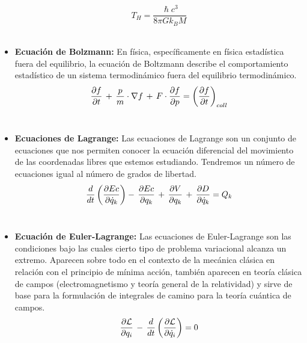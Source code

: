\documentclass[letterpaper, 12pt]{article}
\begin{document}
\begin{itemize}
            \begin{equation*}
                T_{H} = \frac{\hslash c^{3}}{8 \pi Gk_{B}M}
            \end{equation*}\\
            
        \item \textbf{Ecuación de Bolzmann:} En física, específicamente en física estadística fuera del equilibrio, la ecuación de Boltzmann describe el comportamiento estadístico de un sistema termodinámico fuera del equilibrio termodinámico. \\
        
            \begin{equation*}
                \frac{\partial f}{\partial t} \thinspace + \thinspace \frac{p}{m} \cdot \nabla f \thinspace + \thinspace F \cdot \frac{\partial f}{\partial p} = \left( \frac{\partial f}{\partial t} \right) _{coll}
            \end{equation*}\\
            
        \item \textbf{Ecuaciones de Lagrange:} Las ecuaciones de Lagrange son un conjunto de ecuaciones que nos permiten conocer la ecuación diferencial del movimiento de las coordenadas libres que estemos estudiando. Tendremos un número de ecuaciones igual al número de grados de libertad. \\
        
            \begin{equation*}
                \frac{d}{dt} \left( \frac{\partial Ec}{\partial \dot{q}_{k} } \right) - \thinspace \frac{\partial Ec}{\partial q_{k}} \thinspace + \thinspace \frac{\partial V}{\partial q_{k}} \thinspace + \thinspace \frac{\partial D}{\partial \dot{q}_{k}} = Q_{k}
            \end{equation*}\\
            
        \item \textbf{Ecuación de Euler-Lagrange:} Las ecuaciones de Euler-Lagrange son las condiciones bajo las cuales cierto tipo de problema variacional alcanza un extremo. Aparecen sobre todo en el contexto de la mecánica clásica en relación con el principio de mínima acción, también aparecen en teoría clásica de campos (electromagnetismo y teoría general de la relatividad) y sirve de base para la formulación de integrales de camino para la teoría cuántica de campos. \\
        
            \begin{equation*}
                \frac{\partial \mathcal{L}}{\partial q_{i}} \thinspace - \thinspace \frac{d}{dt} \left( \frac{\partial \mathcal{L}}{\partial \dot{q}_{i}} \right) = 0
            \end{equation*}\\
            
    \end{itemize}
    
\end{document}
